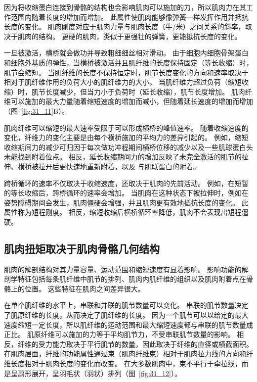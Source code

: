 因为将收缩蛋白连接到骨骼的结构也会影响肌肉可以施加的力，所以肌肉力在其工作范围内随着长度的增加而增加。
此属性使肌肉能够像弹簧一样发挥作用并抵抗长度的变化。
肌肉刚度对应于肌肉力量与肌肉长度（牛/米）之间关系的斜率，取决于肌肉的结构。
更硬的肌肉，类似于更强壮的弹簧，更能抵抗长度的变化。


一旦被激活，横桥就会做功并导致粗细细丝相对滑动。
由于细胞内细胞骨架蛋白和细胞外基质的弹性，当横桥被激活并且肌纤维的长度保持固定（等长收缩）时，肌节会缩短。
当肌纤维的长度不保持恒定时，肌节长度变化的方向和速率取决于相对于肌纤维作用的负荷大小的肌纤维力的大小。
当肌纤维力超过负荷（缩短收缩）时，肌节长度减少，但当力小于负荷时（延长收缩），肌节长度增加。
肌肉纤维可以施加的最大力量随着缩短速度的增加而减小，但随着延长速度的增加而增加（图~\ref{fig:31_11}B）。


肌肉纤维可以缩短的最大速率受限于可以形成横桥的峰值速率。
随着收缩速度的变化，纤维力的变化主要是由每个横桥施加的平均力的差异引起的。
例如，缩短收缩期间力的减少可归因于每次做功冲程期间横桥位移的减少以及一些肌球蛋白头未能找到附着位点。
相反，延长收缩期间力的增加反映了未完全激活的肌节的拉伸、横桥被拉开后更快速地重新附着，以及  与肌联蛋白的附着。


跨桥循环的速率不仅取决于收缩速度，还取决于肌肉的先前活动。
例如，在短暂的等长收缩后，跨桥循环的速率会增加。
当肌肉在这种状态下被拉伸时，例如在姿势障碍期间会发生，肌肉僵硬会增强，并且肌肉更有效地抵抗长度的变化。
此属性称为短程刚度。
相反，缩短收缩后横桥循环率降低，肌肉不会表现出短程僵硬。



\subsection{肌肉扭矩取决于肌肉骨骼几何结构}

肌肉的解剖结构对其力量容量、运动范围和缩短速度有显着影响。
影响功能的解剖学特征包括每条肌纤维中肌节的排列、肌肉内肌纤维的组织以及肌肉附着点在骨骼上的位置。
这些特征在肌肉之间差异很大。


在单个肌纤维的水平上，串联和并联的肌节数量可以变化。
串联的肌节数量决定了肌原纤维的长度，从而决定了肌纤维的长度。
因为一个肌节可以以给定的最大速度缩短一定长度，所以肌纤维的运动范围和最大缩短速度都与串联的肌节数量成正比。
肌原纤维可以施加的力等于平均肌节力，不受串联肌节数量的影响。
相反，纤维的受力能力取决于平行肌节的数量，因此取决于纤维的直径或横截面积。
在肌肉层面，纤维的功能属性通过束（肌肉纤维束）相对于肌肉拉力线的方向和纤维长度相对于肌肉长度的变化而改变。
在大多数肌肉中，束不平行于牵拉线，而是呈扇形展开，呈羽毛状（羽状）排列（图~\ref{fig:31_12}）。


